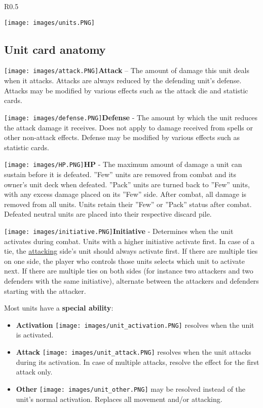 \documentclass[12pt]{article}
\begin{document}
\clearpage
\begin{wrapfigure}{R}{0.5\textwidth}
    \begin{center}
    \texttt{[image: images/units.PNG]}
    \end{center}
\end{wrapfigure}
\subsection*{Unit card anatomy}
\texttt{[image: images/attack.PNG]}\textbf{Attack} – The amount of damage this unit deals when it attacks. Attacks are always reduced by the defending unit’s defense. Attacks may be modified by various effects such as the attack die and statistic cards.\par
\texttt{[image: images/defense.PNG]}\textbf{Defense} - The amount by which the unit reduces the attack damage it receives. Does not apply to damage received from spells or other non-attack effects. Defense may be modified by various effects such as statistic cards.\par
\texttt{[image: images/HP.PNG]}\textbf{\hypertarget{HP}{HP}} - The maximum amount of damage a unit can sustain before it is defeated. ”Few” units are removed from combat and its owner’s unit deck when defeated. ”Pack” units are turned back to ”Few” units, with any excess damage placed on its ”Few” side. After combat, all damage is removed from all units. Units retain their ”Few” or ”Pack” status after combat. Defeated neutral units are placed into their respective discard pile.\par
\texttt{[image: images/initiative.PNG]}{\hypertarget{Initiative}{\textbf{Initiative}}} - Determines when the unit activates during combat. Units with a higher initiative activate first. In case of a tie, the \hyperlink{Combatterminology}{attacking} side’s unit should always activate first. If there are multiple ties on one side, the player who controls those units selects which unit to activate next. If there are multiple ties on both sides (for instance two attackers and two defenders with the same initiative), alternate between the attackers and defenders starting with the attacker.\par
Most units have a \textbf{special ability}:\par
  \begin{minipage}{.6\textwidth}
    \begin{itemize}[wide]
      \item\textbf{Activation} \texttt{[image: images/unit\_activation.PNG]} resolves when the unit is activated.
      \item\textbf{Attack} \texttt{[image: images/unit\_attack.PNG]} resolves when the unit attacks during its activation. In case of multiple attacks, resolve the effect for the first attack only.
      \item\textbf{Other} \texttt{[image: images/unit\_other.PNG]} may be resolved instead of the unit's normal activation. Replaces all movement and/or attacking.
    \end{itemize}
  \end{minipage}
\end{document}

